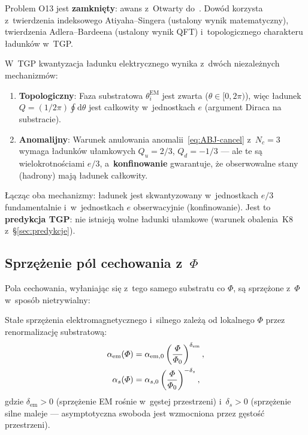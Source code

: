 \begin{remark}[Status O13]\label{rem:O13-closed}
Problem O13 jest \textbf{zamkni\k{e}ty}: awans z~Otwarty
do~.
Dow\'od korzysta z~twierdzenia indeksowego Atiyaha--Singera
(ustalony wynik matematyczny), twierdzenia Adlera--Bardeena
(ustalony wynik QFT) i~topologicznego charakteru
\l{}adunk\'ow w~TGP.
\end{remark}

\begin{proposition}%
\label{prop:charge-quantization-gauge}
W~TGP kwantyzacja ładunku elektrycznego wynika z~dwóch niezależnych
mechanizmów:
\begin{enumerate}[nosep]
    \item \textbf{Topologiczny}: Faza substratowa $\theta_i^{\mathrm{EM}}$
          jest zwarta ($\theta \in [0, 2\pi)$), więc ładunek
          $Q = (1/2\pi)\oint \mathrm{d}\theta$ jest całkowity
          w~jednostkach $e$ (argument Diraca na substracie).
    \item \textbf{Anomalijny}: Warunek anulowania anomalii~\eqref{eq:ABJ-cancel}
          z~$N_c = 3$ wymaga ładunków ułamkowych $Q_u = 2/3$,
          $Q_d = -1/3$ --- ale te są wielokrotnościami $e/3$,
          a~\textbf{konfinowanie} gwarantuje, że obserwowalne
          stany (hadrony) mają ładunek całkowity.
\end{enumerate}
Łącząc oba mechanizmy: ładunek jest skwantyzowany w~jednostkach $e/3$
fundamentalnie i~w~jednostkach $e$ obserwacyjnie (konfinowanie).
Jest to \textbf{predykcja TGP}: nie istnieją wolne ładunki ułamkowe
(warunek obalenia~K8 z~\S\ref{sec:predykcje}).
\end{proposition}

\subsection{Sprzężenie pól cechowania z~$\Phi$}%
\label{ssec:gauge-Phi-coupling}

Pola cechowania, wyłaniając się z~tego samego substratu co $\Phi$,
są sprzężone z~$\Phi$ w~sposób nietrywialny:

\begin{proposition}%
\label{prop:running-coupling}
Stałe sprzężenia elektromagnetycznego i~silnego zależą od lokalnego
$\Phi$ przez renormalizację substratową:
\begin{align}
    \alpha_{\mathrm{em}}(\varPhi)
    &= \alpha_{\mathrm{em},0}
       \left(\frac{\varPhi}{\varPhi_0}\right)^{\delta_{\mathrm{em}}},
    \label{eq:alpha-Phi} \\
    \alpha_s(\varPhi)
    &= \alpha_{s,0}
       \left(\frac{\varPhi}{\varPhi_0}\right)^{-\delta_s},
    \label{eq:alphas-Phi}
\end{align}
gdzie $\delta_{\mathrm{em}} > 0$ (sprzężenie EM rośnie w~gęstej przestrzeni)
i~$\delta_s > 0$ (sprzężenie silne maleje --- asymptotyczna swoboda
jest wzmocniona przez gęstość przestrzeni).
\end{proposition}

